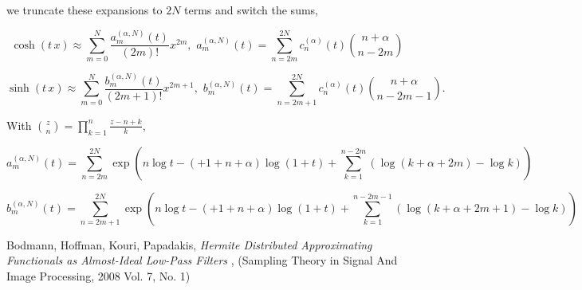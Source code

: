 \documentclass[amsmath,amssymb,floatfix]{revtex4}
\numberwithin{equation}{section}
\newcommand{\floor}[0]{ \textrm{fl} }
\begin{document}

\noindent
we truncate these expansions to $2N$ terms and switch the sums, 



\begin{equation}
\cosh{(t \, x)} \approx  \sum_{m=0}^{N}  \frac{a_m^{(\alpha,N)}(t)  }{(2m)!}   x^{2m}, \, \, a_m^{(\alpha,N)}(t)  =  \sum _{n=2m}^{2N}  {c}_n^{(\alpha)}(t)  \binom {n+\alpha} {n-2m}
\end{equation}

\begin{equation}
\sinh{(t \, x)} \approx  \sum_{m=0}^{N}  \frac{b_m^{(\alpha,N)}(t)  }{(2m+1)!}   x^{2m+1}, \, \, b_m^{(\alpha,N)}(t) =  \sum _{n=2m+1}^{2N}  {c}_n^{(\alpha)}(t)  \binom {n+\alpha} {n-2m-1}.
\end{equation}

With $\binom{z}{n} = \prod_{k=1}^{n} \frac{z-n+k}{k}$,

\begin{equation}
	a_m^{(\alpha,N)}(t)  =  \sum _{n=2m}^{2N}  \exp \left( n \log t - (+1+n+\alpha) \log (1+t) + \sum_{k=1}^{n-2m} \left( \log( k+\alpha +2m ) - \log{k} \right)   \right)
\end{equation}


\begin{equation}
	b_m^{(\alpha,N)}(t)  =  \sum _{n=2m+1}^{2N}  \exp \left( n \log t - (+1+n+\alpha) \log (1+t) + \sum_{k=1}^{n-2m-1} \left( \log( k+\alpha +2m+1 ) - \log{k} \right)   \right)
\end{equation}





\begin{thebibliography}{14}

  Bodmann, Hoffman, Kouri, Papadakis,  \textit{Hermite Distributed Approximating Functionals as Almost-Ideal Low-Pass Filters} , (Sampling Theory in Signal And Image Processing, 2008 Vol. 7, No. 1)

\end{thebibliography}
\end{document}
